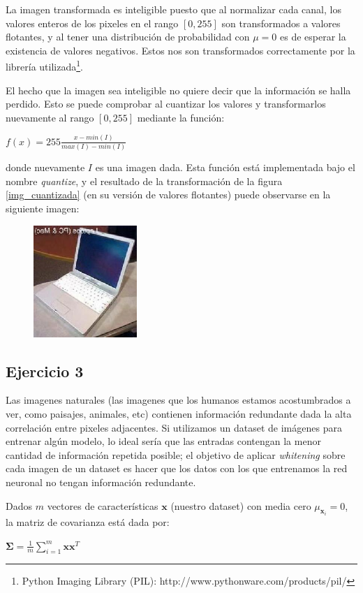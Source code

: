 \documentclass[11pt,spanish]{article}
\begin{document}
La imagen transformada es inteligible puesto que al normalizar cada canal, los valores enteros de los pixeles en el rango $[0,255]$ son transformados a valores flotantes, y al tener una distribución de probabilidad con $\mu=0$ es de esperar la existencia de valores negativos. Estos nos son transformados correctamente por la librería utilizada\footnote{Python Imaging Library (PIL): http://www.pythonware.com/products/pil/}. \par
El hecho que la imagen sea inteligible no quiere decir que la información se halla perdido. Esto se puede comprobar al cuantizar los valores y transformarlos nuevamente al rango $[0,255]$ mediante la función:
\ \
\begin{center}
	\begin{math}
		f(x) = 255 \frac{x-min(I)}{max(I)-min(I)}
	\end{math}
\end{center}
donde nuevamente $I$ es una imagen dada. Esta función está implementada bajo el nombre \textit{quantize}, y el resultado de la transformación de la figura \ref{img_cuantizada} (en su versión de valores flotantes) puede observarse en la siguiente imagen:

\begin{figure}[htbp]
	\centering
	\includegraphics[width=0.35\textwidth]{../quantized_image.jpg}
\end{figure}	

\subsection*{Ejercicio 3}
Las imagenes naturales (las imagenes que los humanos estamos acostumbrados a ver, como paisajes, animales, etc) contienen información redundante dada la alta correlación entre pixeles adjacentes. Si utilizamos un dataset de imágenes para entrenar algún modelo, lo ideal sería que las entradas contengan la menor cantidad de información repetida posible; el objetivo de aplicar \textit{whitening} sobre cada imagen de un dataset es hacer que los datos con los que entrenamos la red neuronal no tengan información redundante. \par
Dados $m$ vectores de características $\mathbf{x}$ (nuestro dataset) con media cero $\mu_{\mathbf{x}_i}=0$, la matriz de covarianza está dada por:
\begin{center}
	\begin{math}
		\mathbf{\Sigma} = \frac{1}{m} \sum_{i=1}^{m} \mathbf{x} \mathbf{x}^T
	\end{math}
\end{center}
\end{document}
